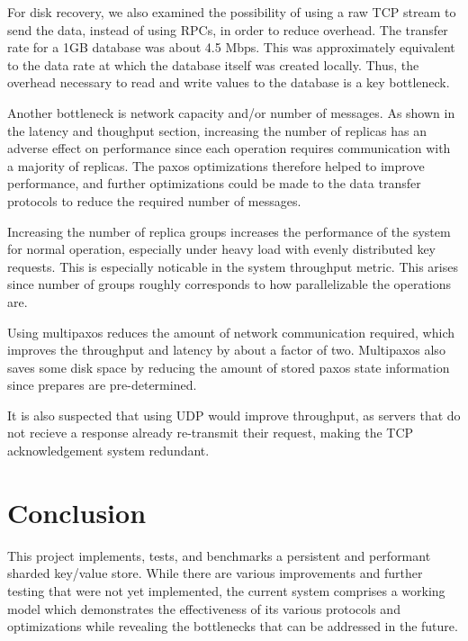 \documentclass[letterpaper,10pt]{article}
\begin{document}
For disk recovery, we also examined the possibility of using a raw TCP
stream to send the data, instead of using RPCs, in order to reduce
overhead. The transfer rate for a 1GB database was about 4.5
Mbps. This was approximately equivalent to the data rate at which the
database itself was created locally. Thus, the overhead necessary to
read and write values to the database is a key bottleneck. 

Another bottleneck is network capacity and/or number of messages.  As
shown in the latency and thoughput section, increasing the number of
replicas has an adverse effect on performance since each operation
requires communication with a majority of replicas.  The paxos
optimizations therefore helped to improve performance, and further
optimizations could be made to the data transfer protocols to reduce
the required number of messages.

Increasing the number of replica groups increases the performance of
the system for normal operation, especially under heavy load with
evenly distributed key requests. This is especially noticable in the
system throughput metric.  This arises since number of groups roughly
corresponds to how parallelizable the operations are.

Using multipaxos reduces the amount of network communication required,
which improves the throughput and latency by about a factor of
two. Multipaxos also saves some disk space by reducing the amount of
stored paxos state information since prepares are pre-determined.

It is also suspected that using UDP would improve throughput, as
servers that do not recieve a response already re-transmit their
request, making the TCP acknowledgement system redundant.

\section{Conclusion}
This project implements, tests, and benchmarks a persistent and
performant sharded key/value store.  While there are various
improvements and further testing that were not yet implemented, the
current system comprises a working model which demonstrates the
effectiveness of its various protocols and optimizations while
revealing the bottlenecks that can be addressed in the future.

\end{document}
